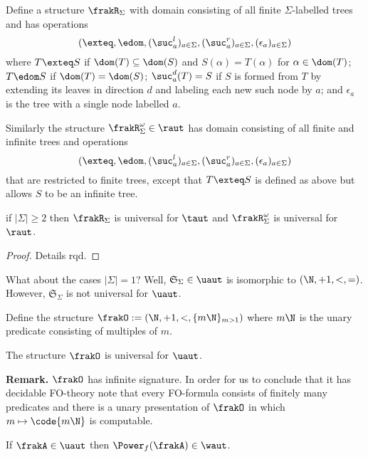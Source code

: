 Define a structure $\frakR_\Sigma$ with domain consisting of all finite $\Sigma$-labelled trees
  and has operations
\[
        (\exteq, \edom, (\suc_a^l)_{a \in \Sigma}, (\suc_a^r)_{a \in \Sigma}, (\epsilon_a)_{a \in \Sigma} )
\]
  where
$T \exteq S$ if $\dom(T) \subseteq \dom(S)$ and $S(\alpha) = T(\alpha)$ for $\alpha \in \dom(T)$;
  $T \edom S$ if $\dom(T) = \dom(S)$;
  $\suc_a^d(T) = S$ if $S$ is formed from $T$ by extending its leaves in direction $d$
  and labeling each new such node by $a$; and
  $\epsilon_a$ is the tree with a single node labelled $a$.

  Similarly the structure $\frakR^\omega_\Sigma \in \raut$ has domain consisting of
  all finite and infinite trees and operations
  \[
        (\exteq, \edom, (\suc_a^l)_{a \in \Sigma}, (\suc_a^r)_{a \in \Sigma}, (\epsilon_a)_{a \in \Sigma} )
  \]
  that are restricted to finite trees, except that $T \exteq S$ is
  defined as above but allows $S$ to be an infinite tree.

\begin{proposition}
 if $|\Sigma| \geq 2$ then $\frakR_\Sigma$ is universal for $\taut$ and $\frakR^{\omega}_\Sigma$ is universal for $\raut$.
\end{proposition}


\begin{proof}
 Details rqd.
\end{proof}

What about the cases $|\Sigma| = 1$? Well, $\mathfrak{S}_\Sigma \in \uaut$ is isomorphic to $(\N,+1,<,=)$.
However, $\mathfrak{S}_\Sigma$ is not universal for $\uaut$.

Define the structure $\frakO := (\N,+1,<,\{m\N\}_{m > 1})$ where $m\N$ is the unary predicate consisting of multiples of $m$.

\begin{proposition}
The structure $\frakO$ is universal for $\uaut$.
\end{proposition}

{\bf Remark.} $\frakO$ has infinite signature. In order for us to conclude that it has decidable FO-theory  
note that every FO-formula consists of finitely many predicates and there is a unary 
presentation of $\frakO$ in which $m \mapsto \code{m\N}$ is computable.


\begin{proposition}
 If $\frakA \in \uaut$ then $\Power_f(\frakA) \in \waut$.
\end{proposition}

